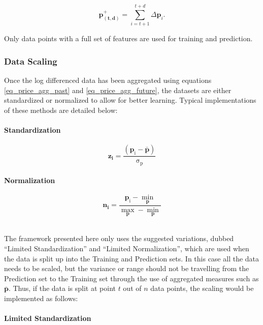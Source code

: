 \documentclass[a4paper,11pt,oneside]{article}
\theoremstyle{plain}
\theoremstyle{definition}
\begin{document}
	\begin{equation}\label{eq_price_agg_future}
	 \mathbf{p^{+}_{(t,d)}} = \sum_{i = t+1}^{t+d} \Delta\mathbf{p}_i .
	\end{equation}
	
	Only data points with a full set of features are used for training and prediction.
	
	\subsubsection{Data Scaling}\label{data_scaling}
	Once the log differenced data has been aggregated using equations \ref{eq_price_agg_past} and \ref{eq_price_agg_future}, the datasets are either standardized or normalized to allow for better learning. Typical implementations of these methods are detailed below:
	
	\paragraph{Standardization}
	\begin{equation}
	\mathbf{z_i}= \mathrm{\frac{(\mathbf{p}_i - \mathbf{\bar{p}}) }{\sigma_p}}
	\end{equation}
	
	\paragraph{Normalization}
	
	\begin{equation}\label{eq_ltd_normalization}
	\mathbf{n_i}= 
	\frac{\mathrm{\mathbf{p}_i - \min\limits_{\mathbf{p}}}}
	{\mathrm{\max\limits_{\mathbf{p}} -\min\limits_{\mathbf{p}}}}
	\end{equation}
	
	~\\
	The framework presented here only uses the suggested variations, dubbed ``Limited Standardization'' and ``Limited Normalization'', which are used when the data is split up into the Training and Prediction sets. In this case all the data needs to be scaled, but the variance or range should not be travelling from the Prediction set to the Training set through the use of aggregated measures such as $\bar{\mathbf{p}}$. Thus, if the data is split at point $t$ out of $n$ data points, the scaling would be implemented as follows:
	
	\paragraph{Limited Standardization}
	
\end{document}
